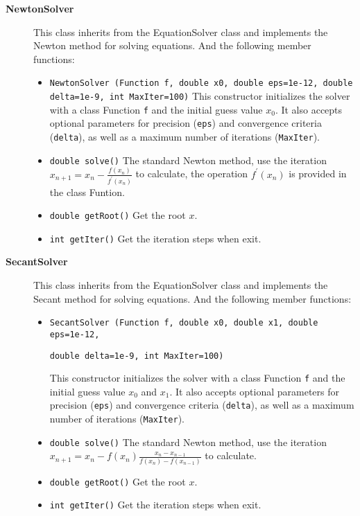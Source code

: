 \documentclass[a4paper]{article}
\begin{document}
\begin{description}
	\item[\textbf{NewtonSolver}] This class inherits from the EquationSolver class and implements the Newton method for solving equations. And the following member functions:
	\begin{itemize}
		\item \texttt{NewtonSolver (Function f, double x0, double eps=1e-12, double delta=1e-9, int MaxIter=100)} This constructor initializes the solver with a class Function \texttt{f} and the initial guess value $x_0$. It also accepts optional parameters for precision (\texttt{eps}) and convergence criteria (\texttt{delta}), as well as a maximum number of iterations (\texttt{MaxIter}).
		\item \texttt{double solve()} The standard Newton method, use the iteration $x_{n+1} = x_n - \frac{f(x_n)}{f^{\prime} (x_n)}$ to calculate, the operation $f^\prime (x_n)$ is provided in the class Funtion.
		\item \texttt{double getRoot()} Get the root $x$. 
		\item \texttt{int getIter()} Get the iteration steps when exit. 
	\end{itemize}

	\item[\textbf{SecantSolver}] This class inherits from the EquationSolver class and implements the Secant method for solving equations. And the following member functions:
	\begin{itemize}
		\item \texttt{SecantSolver (Function f, double x0, double x1, double eps=1e-12, }
		
		\hspace{73pt}\texttt{double delta=1e-9, int MaxIter=100)} 
		
		This constructor initializes the solver with a class Function \texttt{f} and the initial guess value $x_0$ and $x_1$. It also accepts optional parameters for precision (\texttt{eps}) and convergence criteria (\texttt{delta}), as well as a maximum number of iterations (\texttt{MaxIter}).
		\item \texttt{double solve()} The standard Newton method, use the iteration $x_{n+1} = x_n - f(x_n) \frac{x_n - x_{n-1}}{f(x_n) - f(x_{n-1})}$ to calculate. 
		\item \texttt{double getRoot()} Get the root $x$. 
		\item \texttt{int getIter()} Get the iteration steps when exit. 
	\end{itemize}
\end{description}
\end{document}
